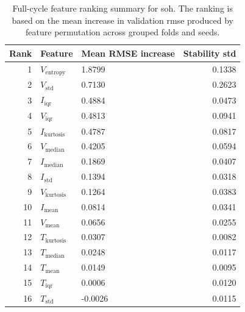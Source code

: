 \begin{table}[H]
    \centering
    \caption{Full-cycle feature ranking summary for \ac{soh}. The ranking is based on the mean increase in validation \ac{rmse} produced by feature permutation across grouped folds and seeds.}
    \label{tab:full_cycle_soh_ranking}
    \begin{tabular}{rllr}
    \toprule
    Rank & Feature & Mean RMSE increase & Stability std \\
    \midrule
    1 & $V_{\mathrm{entropy}}$ & 1.8799 & 0.1338 \\
    2 & $V_{\mathrm{std}}$ & 0.7130 & 0.2623 \\
    3 & $I_{\mathrm{iqr}}$ & 0.4884 & 0.0473 \\
    4 & $V_{\mathrm{iqr}}$ & 0.4813 & 0.0941 \\
    5 & $I_{\mathrm{kurtosis}}$ & 0.4787 & 0.0817 \\
    6 & $V_{\mathrm{median}}$ & 0.4205 & 0.0594 \\
    7 & $I_{\mathrm{median}}$ & 0.1869 & 0.0407 \\
    8 & $I_{\mathrm{std}}$ & 0.1394 & 0.0318 \\
    9 & $V_{\mathrm{kurtosis}}$ & 0.1264 & 0.0383 \\
    10 & $I_{\mathrm{mean}}$ & 0.0814 & 0.0341 \\
    11 & $V_{\mathrm{mean}}$ & 0.0656 & 0.0255 \\
    12 & $T_{\mathrm{kurtosis}}$ & 0.0307 & 0.0082 \\
    13 & $T_{\mathrm{median}}$ & 0.0248 & 0.0117 \\
    14 & $T_{\mathrm{mean}}$ & 0.0149 & 0.0095 \\
    15 & $T_{\mathrm{iqr}}$ & 0.0006 & 0.0120 \\
    16 & $T_{\mathrm{std}}$ & -0.0026 & 0.0115 \\
    \bottomrule
    \end{tabular}
\end{table}

